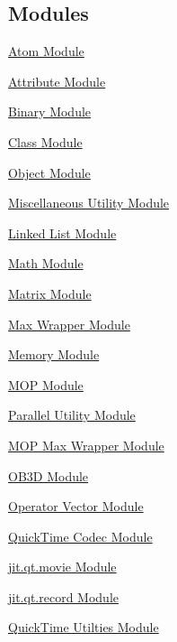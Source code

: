\subsection*{Modules}
\begin{DoxyCompactItemize}
\item 
\hyperlink{group__atommod}{Atom Module}
\item 
\hyperlink{group__attrmod}{Attribute Module}
\item 
\hyperlink{group__binmod}{Binary Module}
\item 
\hyperlink{group__classmod}{Class Module}
\item 
\hyperlink{group__objectmod}{Object Module}
\item 
\hyperlink{group__utilitymod}{Miscellaneous Utility Module}
\item 
\hyperlink{group__linklistmod}{Linked List Module}
\item 
\hyperlink{group__mathmod}{Math Module}
\item 
\hyperlink{group__matrixmod}{Matrix Module}
\item 
\hyperlink{group__maxwrapmod}{Max Wrapper Module}
\item 
\hyperlink{group__memorymod}{Memory Module}
\item 
\hyperlink{group__mopmod}{MOP Module}
\item 
\hyperlink{group__parallelutilmod}{Parallel Utility Module}
\item 
\hyperlink{group__maxmopmod}{MOP Max Wrapper Module}
\item 
\hyperlink{group__ob3dmod}{OB3D Module}
\item 
\hyperlink{group__opvecmod}{Operator Vector Module}
\item 
\hyperlink{group__qtcodecmod}{QuickTime Codec Module}
\item 
\hyperlink{group__qtmoviemod}{jit.qt.movie Module}
\item 
\hyperlink{group__qtrecordmod}{jit.qt.record Module}
\item 
\hyperlink{group__qtutilsmod}{QuickTime Utilties Module}
\end{DoxyCompactItemize}
